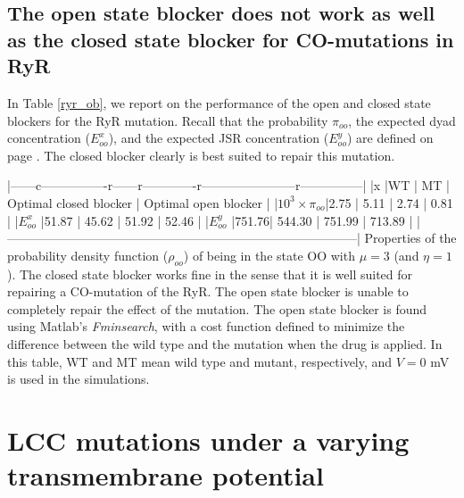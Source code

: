 \subsection{The open state blocker does not work as well as the closed state blocker for CO-mutations in RyR}

In Table \ref{ryr_ob},  we report on the performance of the open and closed state blockers for the RyR mutation. Recall that the probability $\pi_{oo}$, the expected dyad concentration ($E^x_{oo}$), and the expected JSR concentration ($E^y_{oo}$) are defined on page \pageref{statistics}.  The closed blocker clearly is best suited to repair this mutation.






|------c----------------r------r-------------r-----------------------r---------------|
|x                   |WT    | MT     | Optimal closed blocker | Optimal open blocker |
|$10^3\times\pi_{oo}$|2.75  | 5.11   | 2.74                   | 0.81                 |
|$E^x_{oo}$          |51.87 | 45.62  | 51.92                  | 52.46                |
|$E^y_{oo}$          |751.76| 544.30 | 751.99                 | 713.89               |
|------------------------------------------------------------------------------------|
Properties of the probability density function ($\rho_{oo}$) of being in the state OO with $\mu=3$ (and  $\eta=1$). The closed state blocker works fine in the sense that it is well suited for repairing a CO-mutation of the RyR.
The  open state blocker is unable to completely repair the effect of the mutation. The open state blocker is found using Matlab's {\it Fminsearch},
with a cost function defined to minimize the difference between the wild type and the mutation when the drug is applied.
In this table, WT and MT mean wild type and mutant, respectively, and  $V=0$ mV is used in the simulations.
 \label{ryr_ob}





\section[LCC mutations]{LCC mutations under a varying transmembrane potential}

